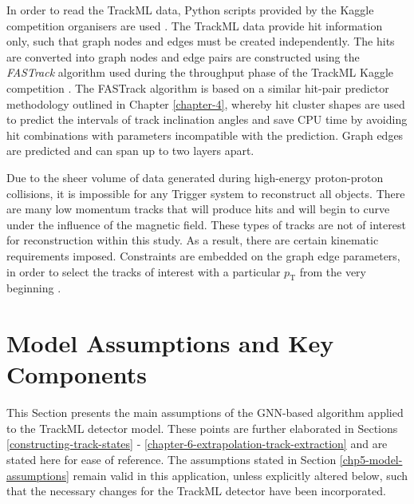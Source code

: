 In order to read the TrackML data, Python scripts provided by the Kaggle competition organisers are used \cite{python-scripts-kaggle}. The TrackML data provide hit information only, such that graph nodes and edges must be created independently. The hits are converted into graph nodes and edge pairs are constructed using the \textit{FASTrack} algorithm used during the throughput phase of the TrackML Kaggle competition \cite{Amrouche2023}. The FASTrack algorithm is based on a similar hit-pair predictor methodology outlined in Chapter \ref{chapter-4}, whereby hit cluster shapes are used to predict the intervals of track inclination angles and save CPU time by avoiding hit combinations with parameters incompatible with the prediction. Graph edges are predicted and can span up to two layers apart.

Due to the sheer volume of data generated during high-energy proton-proton collisions, it is impossible for any Trigger system to reconstruct all objects. There are many low momentum tracks that will produce hits and will begin to curve under the influence of the magnetic field. These types of tracks are not of interest for reconstruction within this study. As a result, there are certain kinematic requirements imposed. Constraints are embedded on the graph edge parameters, in order to select the tracks of interest with a particular $p_{\text{T}}$ from the very beginning \cite{Dmitry-fasttrack-addtest}. 



\section{Model Assumptions and Key Components}
\label{chp6-model-assumptions}

This Section presents the main assumptions of the GNN-based algorithm applied to the TrackML detector model. These points are further elaborated in Sections \ref{constructing-track-states} - \ref{chapter-6-extrapolation-track-extraction} and are stated here for ease of reference. The assumptions stated in Section \ref{chp5-model-assumptions} remain valid in this application, unless explicitly altered below, such that the necessary changes for the TrackML detector have been incorporated.


